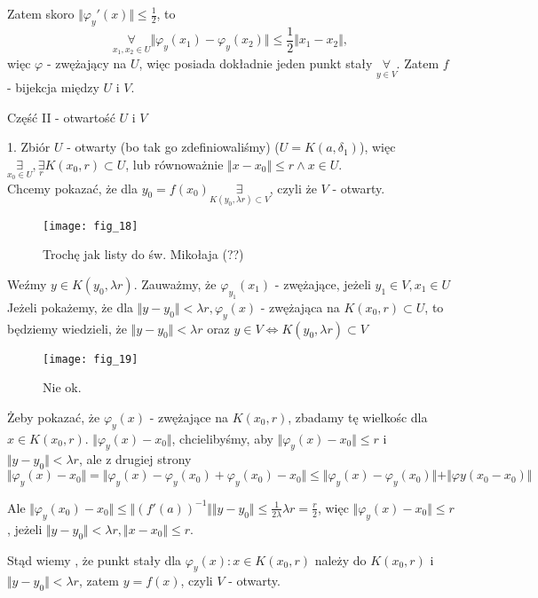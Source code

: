 \documentclass[../main.tex]{subfiles}
\begin{document}
Zatem skoro $\Vert \varphi_y '(x) \Vert \leq \frac{1}{2}$, to
$$\underset{x_1,x_2\in U}{\forall}\Vert \varphi_y(x_1) - \varphi_y (x_2) \Vert \leq \frac{1}{2} \Vert x_1 - x_2 \Vert,$$
więc $\varphi$ - zwężający na $U$, więc posiada dokładnie jeden punkt stały $\underset{y\in V}{\forall}$. Zatem $f$ - bijekcja między $U$ i $V$.

Część II - otwartość $U$ i $V$

1. Zbiór $U$ - otwarty (bo tak go zdefiniowaliśmy) ($U = K(a,\delta_1)$), więc $\underset{x_0\in U}{\exists}, \underset{r}{\exists}K(x_0,r)\subset U$, lub równoważnie $\Vert x-x_0 \Vert \leq r \land x\in U$.\\
Chcemy pokazać, że dla $y_0 = f(x_0) \underset{K(y_0,\lambda r)\subset V}{\exists}$, czyli że $V$ - otwarty.
\begin{figure}[h]
    \centering
    \texttt{[image: fig\_18]}
    \caption{Trochę jak listy do św. Mikołaja (??)}
    \label{fig:fig_18}
\end{figure}

Weźmy $y\in K(y_0,\lambda r)$. Zauważmy, że $\varphi_{y_1}(x_1)$ - zwężające, jeżeli $y_1\in V, x_1\in U$\\
Jeżeli pokażemy, że dla $\Vert y-y_0\Vert < \lambda r, \varphi_y(x)$ - zwężająca na $K(x_0,r)\subset U$, to będziemy wiedzieli, że $\Vert y - y_0 \Vert < \lambda r$ oraz $y\in V \iff K(y_0,\lambda r)\subset V$

\begin{figure}[h]
    \centering
    \texttt{[image: fig\_19]}
    \caption{Nie ok.}
    \label{fig:fig_19}
\end{figure}

Żeby pokazać, że $\varphi_y(x)$ - zwężające na $K(x_0,r)$, zbadamy tę wielkośc dla $x\in K(x_0,r)$.
$\Vert \varphi_y(x) - x_0 \Vert$, chcielibyśmy, aby $\Vert \varphi_y(x) - x_0 \Vert \leq r $ i $\Vert y - y_0 \Vert < \lambda r$, ale z drugiej strony
$$\Vert \varphi_y(x) - x_0 \Vert = \Vert \varphi_y(x) - \varphi_y(x_0) + \varphi_y(x_0) - x_0 \Vert \leq \Vert \varphi_y(x) - \varphi_y(x_0) \Vert + \Vert \varphi y(x_0 - x_0) \Vert$$

Ale $\Vert \varphi_y(x_0) - x_0 \Vert \leq \Vert (f'(a))^{-1} \Vert \Vert y - y_0 \Vert \leq \frac{1}{2\lambda} \lambda r = \frac{r}{2}$, więc $\Vert \varphi_y(x) - x_0 \Vert \leq r$, jeżeli $\Vert y - y_0 \Vert < \lambda r, \Vert x - x_0 \Vert \leq r$.

Stąd wiemy , że punkt stały dla $\varphi_y(x):x\in K(x_0,r)$ należy do $K(x_0,r)$ i $\Vert y - y_0 \Vert <\lambda r$, zatem $y=f(x)$, czyli $V$ - otwarty.
\end{document}

